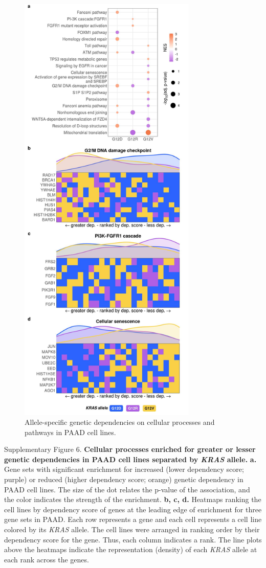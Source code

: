 \documentclass[english, 10pt, letterpaper]{article}
\newcommand{\KRAS}{\emph{KRAS}}
\begin{document}
\begin{figure}[h!]
\centering
\includegraphics[width=85mm]{figures/Supp_Fig_6.jpeg}
\caption{Allele-specific genetic dependencies on cellular processes and pathways in PAAD cell lines.}
\label{sfig:paad-dependency-gsea}
\end{figure}
\newpage
\noindent Supplementary Figure 6. \textbf{Cellular processes enriched for greater or lesser genetic dependencies in PAAD cell lines separated by \KRAS{} allele.}
\textbf{a.} Gene sets with significant enrichment for increased (lower dependency score; purple) or reduced (higher dependency score; orange) genetic dependency in PAAD cell lines. The size of the dot relates the p-value of the association, and the color indicates the strength of the enrichment.
\textbf{b, c, d.} Heatmaps ranking the cell lines by dependency score of genes at the leading edge of enrichment for three gene sets in PAAD. Each row represents a gene and each cell represents a cell line colored by its \KRAS{} allele. The cell lines were arranged in ranking order by their dependency score for the gene. Thus, each column indicates a rank. The line plots above the heatmaps indicate the representation (density) of each \KRAS{} allele at each rank across the genes.
\newpage
\end{document}
